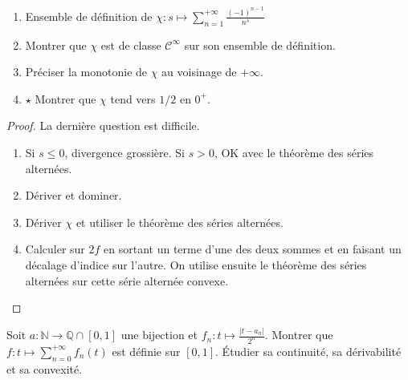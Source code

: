 \documentclass[french,a4paper]{article}
\newcommand{\N}{\mathbb{N}}
\newcommand{\Q}{\mathbb{Q}}
\theoremstyle{plain}
\theoremstyle{definition}
\theoremstyle{remark}
\begin{document}
\begin{ex}{}
	\begin{enumerate}
		\item Ensemble de définition de $\chi:s\mapsto\displaystyle\sum_{n=1}^{+\infty}\frac{(-1)^{n-1}}{n^s}$
		\item Montrer que $\chi$ est de classe $\mathcal{C}^\infty$ sur son ensemble de définition.
		\item Préciser la monotonie de $\chi$ au voisinage de $+\infty$.
		\item $\star$ Montrer que $\chi$ tend vers $1/2$ en $0^+$.
	\end{enumerate}
\end{ex}
\begin{proof}
	La dernière question est difficile.
	\begin{enumerate}
		\item Si $s\leqslant0$, divergence grossière. Si $s>0$, OK avec le théorème des séries alternées.
		\item Dériver et dominer.
		\item Dériver $\chi$ et utiliser le théorème des séries alternées.
		\item Calculer sur $2f$ en sortant un terme d'une des deux sommes et en faisant un décalage d'indice sur l'autre. On utilise ensuite le théorème des séries alternées sur cette série alternée convexe.
	\end{enumerate}
\end{proof}

\begin{ex}{}
	Soit $a:\N\to\Q\cap[0,1]$ une bijection et $f_n:t\mapsto\displaystyle\frac{\lvert t-a_n\rvert}{2^n}$. Montrer que $f:t\mapsto\displaystyle\sum_{n=0}^{+\infty}f_n(t)$ est définie sur $[0,1]$. Étudier sa continuité, sa dérivabilité et sa convexité.
\end{ex}
\end{document}
